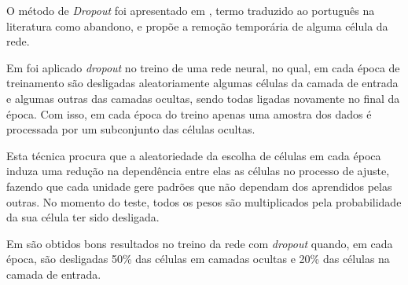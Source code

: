     O método de \textit{Dropout} foi apresentado em \cite{dropout}, termo traduzido ao português na literatura como abandono, e propõe a remoção temporária de alguma célula da rede. 
    
    Em \cite{dropoutapp} foi aplicado \textit{dropout} no treino de uma rede neural, no qual, em cada época de treinamento são desligadas aleatoriamente algumas células da camada de entrada e algumas outras das camadas ocultas, sendo todas ligadas novamente no final da época. Com isso, em cada época do treino apenas uma amostra dos dados é processada por um subconjunto das células ocultas.  
    
    Esta técnica procura que a aleatoriedade da escolha de células em cada época induza uma redução na dependência entre elas as células no processo de ajuste, fazendo que cada unidade gere padrões que não dependam dos aprendidos pelas outras. No momento do teste, todos os pesos são multiplicados pela probabilidade da sua célula ter sido desligada. 
    
    Em \cite{dropoutapp} são obtidos bons resultados no treino da rede com \textit{dropout} quando, em cada época,  são desligadas 50\% das células em camadas ocultas e 20\% das células na camada de entrada.
    

    

